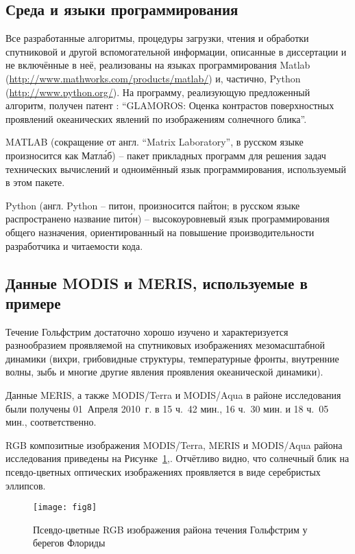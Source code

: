 \subsection{Среда и языки программирования}

Все разработанные алгоритмы, процедуры загрузки, чтения и обработки спутниковой и другой вспомогательной информации, описанные в диссертации и не включённые в неё, реализованы на языках программирования Matlab (\url{http://www.mathworks.com/products/matlab/}) и, частично, Python (\url{http://www.python.org/}). На программу, реализующую предложенный алгоритм, получен патент \citep{mag2011}: ``GLAMOROS: Оценка контрастов поверхностных проявлений океанических явлений по изображениям солнечного блика''.

MATLAB (сокращение от англ. ``Matrix Laboratory'', в русском языке произносится как Матл\'{а}б) -- пакет прикладных программ для решения задач технических вычислений и одноимённый язык программирования, используемый в этом пакете.

Python (англ. Python -- питон, произносится па\'{й}тон; в русском языке распространено название пит\'{о}н) -- высокоуровневый язык программирования общего назначения, ориентированный на повышение производительности разработчика и читаемости кода.



\subsection{Данные MODIS и MERIS, используемые в примере}

Течение Гольфстрим достаточно хорошо изучено и характеризуется разнообразием проявляемой на спутниковых изображениях мезомасштабной динамики (вихри, грибовидные структуры, температурные фронты, внутренние волны, зыбь и многие другие явления проявления океанической динамики).

Данные MERIS, а также MODIS/Terra и MODIS/Aqua в районе исследования были получены 01~Апреля 2010~г. в 15 ч.~42 мин., 16 ч.~30 мин. и 18 ч.~05 мин., соответственно.

RGB композитные изображения MODIS/Terra, MERIS и MODIS/Aqua района исследования приведены на Рисунке~\ref{fig:8},. Отчётливо видно, что солнечный блик на псевдо-цветных оптических изображениях проявляется в виде серебристых эллипсов.



\begin{figure}[!thb]
    \texttt{[image: fig8]}
    \caption{Псевдо-цветные RGB изображения района течения Гольфстрим у берегов Флориды}
    \label{fig:8}
\end{figure}




